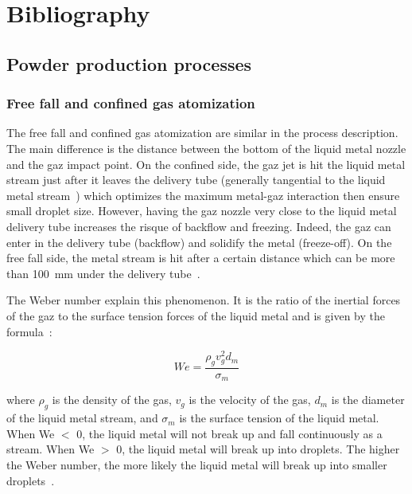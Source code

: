 \section{Bibliography}

\subsection{Powder production processes}

\subsubsection{Free fall and confined gas atomization}

The free fall and confined gas atomization are similar in the process description. The main difference is the distance between the bottom of the liquid metal nozzle and the gaz impact point. On the confined side, the gaz jet is hit the liquid metal stream just after it leaves the delivery tube (generally tangential to the liquid metal stream~\cite{Singh2001Studyfree}) which optimizes the maximum metal-gaz interaction then ensure small droplet size. However, having the gaz nozzle very close to the liquid metal delivery tube increases the risque of backflow and freezing. Indeed, the gaz can enter in the delivery tube (backflow) and solidify the metal (freeze-off). On the free fall side, the metal stream is hit after a certain distance which can be more than 100~mm under the delivery tube~\cite{Kassym2020Atomizationprocesses}.


The Weber number explain this phenomenon. It is the ratio of the inertial forces of the gaz to the surface tension forces of the liquid metal and is given by the formula~\cite{Chang2022Numericalsimulation}:

\begin{equation}
    \boxed{We = \frac{\rho_g v_g^2 d_m}{\sigma_m}}
\end{equation}

where $\rho_g$ is the density of the gas, $v_g$ is the velocity of the gas, $d_m$ is the diameter of the liquid metal stream, and $\sigma_m$ is the surface tension of the liquid metal. When We $<$ 0, the liquid metal will not break up and fall continuously as a stream. When We $>$ 0, the liquid metal will break up into droplets. The higher the Weber number, the more likely the liquid metal will break up into smaller droplets~\cite{Du2024NumericalSimulation}.\\

